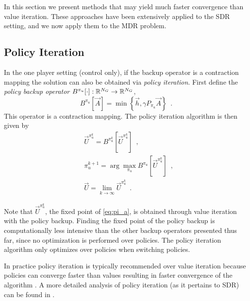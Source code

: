 In this section we present methods that may yield much faster convergence than value iteration. These approaches have been extensively applied to the SDR setting, and we now apply them to the MDR problem. 

\subsection{Policy Iteration}

In the one player setting (control only), if the backup operator is a contraction mapping the solution can also be obtained via \emph{policy iteration}. First define the \emph{policy backup operator} $B^{\pi_u}[\cdot]: \mathbb{R}^{N_G} \rightarrow \mathbb{R}^{N_G}$, 
%
\begin{equation} \label{eq:backup_policy}
B^{\pi_u}[\vec{A}] = \min\left\{ \vec{h}, \gamma P_{\pi_u} \vec{A} \right \} \enspace.
\end{equation}%
\noindent This operator is a contraction mapping. The policy iteration algorithm is then given by
%
\begin{subequations}\label{eq:pi}
\begin{align}
&\vec{U}^{\pi_u^k} = B^{\pi_u^k}[\vec{U}^{\pi_u^k}] \label{eq:pi_a} \enspace,\\
&\pi_u^{k+1} = \arg\underset{\pi_u}{\max}B^{\pi_u}[\vec{U}^{\pi_u^k}] \enspace,\\ 
&\vec{U} = \lim_{k\rightarrow \infty} \vec{U}^{\pi_u^k}\enspace.
\end{align}
\end{subequations}

Note that ${\vec{U}^{\pi_u^k}}$, the fixed point of \eqref{eq:pi_a}, is obtained through value iteration with the policy backup. Finding the fixed point of the policy backup is computationally less intensive than the other backup operators presented thus far, since no optimization is performed over policies. The policy iteration algorithm only optimizes over policies when switching policies.  

In practice policy iteration is typically recommended over value iteration because policies can converge faster than values resulting in faster convergence of the algorithm \cite{Russell2003}. A more detailed analysis of policy iteration (as it pertains to SDR) can be found in \cite{Howard1964, Puterman1979}. 

